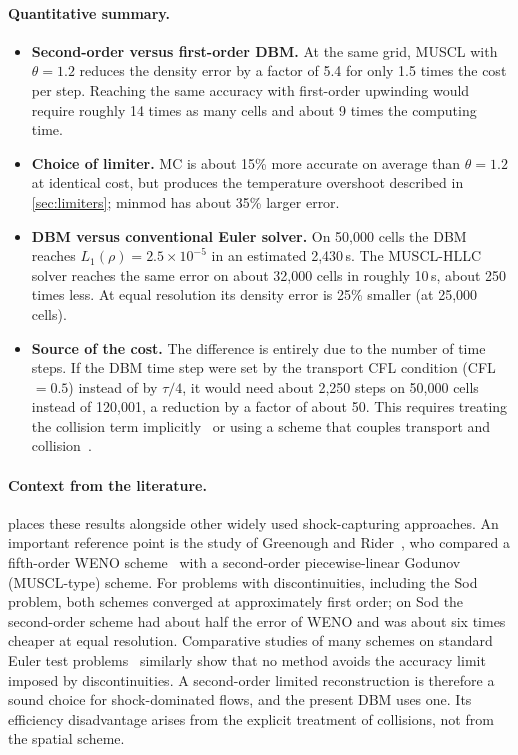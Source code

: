 \paragraph{Quantitative summary.}
\begin{itemize}
  \item \textbf{Second-order versus first-order DBM.}  At the same grid, MUSCL with
        $\theta = 1.2$ reduces the density error by a factor of 5.4 for only 1.5 times the
        cost per step.  Reaching the same accuracy with first-order upwinding would require
        roughly 14 times as many cells and about 9 times the computing time.
  \item \textbf{Choice of limiter.}  MC is about 15\% more accurate on average than
        $\theta = 1.2$ at identical cost, but produces the temperature overshoot described in
        \cref{sec:limiters}; minmod has about 35\% larger error.
  \item \textbf{DBM versus conventional Euler solver.}  On 50{,}000 cells the DBM reaches
        $L_1(\rho) = 2.5\times10^{-5}$ in an estimated 2{,}430\,s.  The MUSCL-HLLC solver reaches the
        same error on about 32{,}000 cells in roughly 10\,s, about 250 times less.  At equal
        resolution its density error is 25\% smaller (at 25{,}000 cells).
  \item \textbf{Source of the cost.}  The difference is entirely due to the number of time
        steps.  If the DBM time step were set by the transport CFL condition (CFL $= 0.5$)
        instead of by $\tau/4$, it would need about 2{,}250 steps on 50{,}000 cells instead of
        120{,}001, a reduction by a factor of about 50.  This requires treating the collision
        term implicitly~\citep{PareschiRusso2005} or using a scheme that couples transport and
        collision~\citep{Guo2013}.
\end{itemize}

\paragraph{Context from the literature.}
 places these results alongside other widely used shock-capturing
approaches.  An important reference point is the study of Greenough and
Rider~\citep{Greenough2004}, who compared a fifth-order WENO scheme~\citep{JiangShu1996}
with a second-order piecewise-linear Godunov (MUSCL-type) scheme.  For problems with
discontinuities, including the Sod problem, both schemes converged at approximately first
order; on Sod the second-order scheme had about half the error of WENO and was about six
times cheaper at equal resolution.  Comparative studies of many schemes on standard Euler
test problems~\citep{LiskaWendroff2003} similarly show that no method avoids the
accuracy limit imposed by discontinuities.  A second-order limited reconstruction is
therefore a sound choice for shock-dominated flows, and the present DBM uses one.  Its
efficiency disadvantage arises from the explicit treatment of collisions, not from the
spatial scheme.

